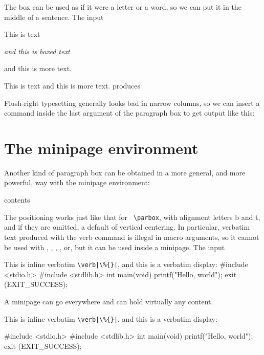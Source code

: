 {The box can be used as if it were a letter or a word, so we can put it in
the middle of a sentence. The input

This is text \parbox{30pt}{\it and this is boxed text} and
this is more text.

This is text 
and this is more text.
produces


Flush-right typesetting generally looks bad in narrow columns, so we
can insert a  command inside the last argument of the paragraph
box to get output like this:


\section*{The minipage environment}
Another kind of paragraph box can be obtained in a more general, and
more powerful, way with the minipage environment:

\begin{teX}
\begin{minipage}[position]{width}
   contents
\end{minipage}
\end{teX}


The positioning works just like that for \verb+ \parbox+, with alignment letters b
and t, and if they are omitted, a default of vertical centering.
In particular, verbatim text produced with the verb command is illegal
in macro arguments, so it cannot be used with , , ,
, or, but it can be used inside a minipage. The input


\begin{teX}
\begin{minipage}{170pt}
This is inline verbatim \verb=\verb|\%{}|=, and this
is a verbatim display:
%
#include <stdio.h>
#include <stdlib.h>
int main(void)
{
printf("Hello, world\n");
exit (EXIT_SUCCESS);
}

\end{minipage}
\end{teX}


A minipage can go everywhere and can hold virtually any content.


\begin{minipage}{130pt}
This is inline verbatim \verb=\verb|\%{}|=, and this
is a verbatim display:
\begin{teX}
%
#include <stdio.h>
#include <stdlib.h>
int main(void)
{
printf("Hello, world\n");
exit (EXIT_SUCCESS);
}
\end{teX}
\end{minipage}



}
